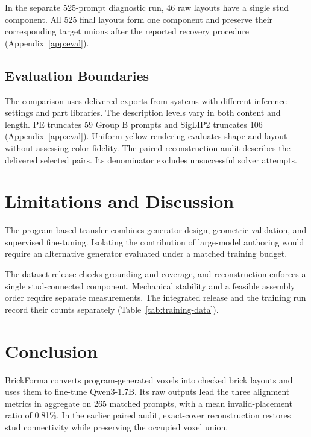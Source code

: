 In the separate 525-prompt diagnostic run, 46 raw layouts have a single stud component. All 525 final layouts form one component and preserve their corresponding target unions after the reported recovery procedure (Appendix~\ref{app:eval}).

\subsection{Evaluation Boundaries}
The comparison uses delivered exports from systems with different inference settings and part libraries. The description levels vary in both content and length. PE truncates 59 Group B prompts and SigLIP2 truncates 106 (Appendix~\ref{app:eval}). Uniform yellow rendering evaluates shape and layout without assessing color fidelity. The paired reconstruction audit describes the delivered selected pairs. Its denominator excludes unsuccessful solver attempts.

\section{Limitations and Discussion}
The program-based transfer combines generator design, geometric validation, and supervised fine-tuning. Isolating the contribution of large-model authoring would require an alternative generator evaluated under a matched training budget.

The dataset release checks grounding and coverage, and reconstruction enforces a single stud-connected component. Mechanical stability and a feasible assembly order require separate measurements. The integrated release and the training run record their counts separately (Table~\ref{tab:training-data}).

\section{Conclusion}
BrickForma converts program-generated voxels into checked brick layouts and uses them to fine-tune Qwen3-1.7B. Its raw outputs lead the three alignment metrics in aggregate on 265 matched prompts, with a mean invalid-placement ratio of 0.81\%. In the earlier paired audit, exact-cover reconstruction restores stud connectivity while preserving the occupied voxel union.

